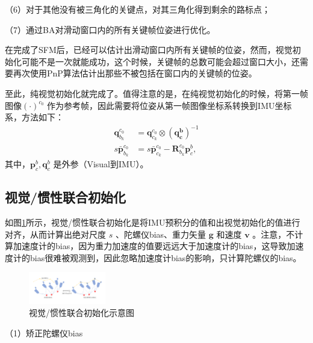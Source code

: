 （6）对于其他没有被三角化的关键点，对其三角化得到剩余的路标点；

（7）通过BA对滑动窗口内的所有关键帧位姿进行优化。

在完成了SFM后，已经可以估计出滑动窗口内所有关键帧的位姿，然而，视觉初始化可能不是一次就能成功，这个时候，关键帧的总数可能会超过窗口大小，还需要再次使用PnP算法估计出那些不被包括在窗口内的关键帧的位姿。

至此，纯视觉初始化就完成了。值得注意的是，在纯视觉初始化的时候，将第一帧图像$ {(\cdot)}^{c_0} $ 作为参考帧，因此需要将位姿从第一帧图像坐标系转换到IMU坐标系，方法如下：
\begin{equation}
\label{eqn:3.83}
\begin{split}
\mathbf{q}_{b_k}^{c_0}&=\mathbf{q}_{c_k}^{c_0}\otimes(\mathbf{q_c^b})^{-1} \\
s\bar{\mathbf{p}}_{b_k}^{c_0}&=s\bar{\mathbf{p}}_{c_k}^{c_0}-\mathbf{R}_{b_k}^{c_0}\mathbf{p}_c^b,
\end{split}
\end{equation}
其中，$ \mathbf{p}_c^b,\mathbf{q}_c^b $ 是外参（Visual到IMU）。
\subsection{视觉/惯性联合初始化}
如图\ref{fig3_12}所示，视觉/惯性联合初始化是将IMU预积分的值和出视觉初始化的值进行对齐，从而计算出绝对尺度 $s $ 、陀螺仪bias、重力矢量 $\mathbf{g} $ 和速度 $\mathbf{v}$ 。注意，不计算加速度计的bias，因为重力加速度的值要远远大于加速度计的bias，这导致加速度计的bias很难被观测到，因此忽略加速度计bias的影响，只计算陀螺仪的bias。
\begin{figure}[h]\setlength{\belowcaptionskip}{-12pt}
	\centering
	\includegraphics[width=0.3\textwidth, angle=-90]{figures/chapter3/fig3_12}
	\caption{视觉/惯性联合初始化示意图}\label{fig3_12}
\end{figure}

（1）矫正陀螺仪bias

